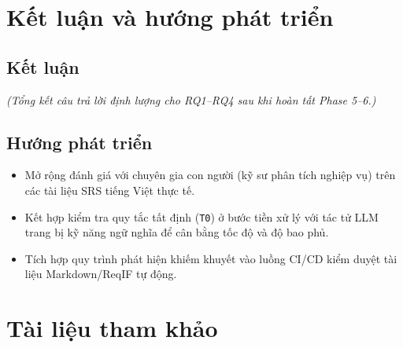\documentclass[12pt,a4paper]{report}
\begin{document}
\chapter{Kết luận và hướng phát triển}

\section{Kết luận}
\textit{(Tổng kết câu trả lời định lượng cho RQ1--RQ4 sau khi hoàn tất Phase 5--6.)}

\section{Hướng phát triển}
\begin{itemize}
  \item Mở rộng đánh giá với chuyên gia con người (kỹ sư phân tích nghiệp vụ) trên các tài liệu SRS tiếng Việt thực tế.
  \item Kết hợp kiểm tra quy tắc tất định (\texttt{T0}) ở bước tiền xử lý với tác tử LLM trang bị kỹ năng ngữ nghĩa để cân bằng tốc độ và độ bao phủ.
  \item Tích hợp quy trình phát hiện khiếm khuyết vào luồng CI/CD kiểm duyệt tài liệu Markdown/ReqIF tự động.
\end{itemize}

\chapter*{Tài liệu tham khảo}
\end{document}
